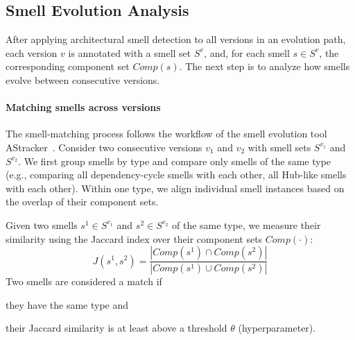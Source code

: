 \subsection{Smell Evolution Analysis}
After applying architectural smell detection to all versions in an evolution path, each version $v$ is annotated with a smell set $S^v$, and, for each smell $s \in S^v$, the corresponding component set $\mathit{Comp}(s)$.
The next step is to analyze how smells evolve between consecutive versions.

\paragraph{Matching smells across versions}
The smell-matching process follows the workflow of the smell evolution tool AStracker~\cite{sas_2022_evolution}.
Consider two consecutive versions $v_1$ and $v_2$ with smell sets $S^{v_1}$ and $S^{v_2}$.
We first group smells by type and compare only smells of the same type (e.g., comparing all dependency-cycle smells with each other, all Hub-like smells with each other).
Within one type, we align individual smell instances based on the overlap of their component sets.

Given two smells $s^1 \in S^{v_1}$ and $s^2 \in S^{v_2}$ of the same type, we measure their similarity using the Jaccard index over their component sets $\mathit{Comp}(\cdot)$:
\begin{equation}
    \label{eq:jac}
    J(s^1, s^2) =
    \frac{\left| \mathit{Comp}(s^1) \cap \mathit{Comp}(s^2) \right|}
    {\left| \mathit{Comp}(s^1) \cup \mathit{Comp}(s^2) \right|}
\end{equation}
Two smells are considered a match if
\begin{enumerate*}[label=(\roman*)]
    \item they have the same type and
    \item their Jaccard similarity is at least above a threshold $\theta$ (hyperparameter).
\end{enumerate*}


